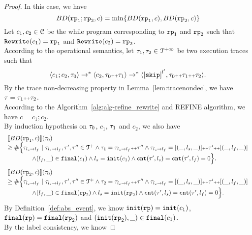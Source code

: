 \begin{proof}
In this case, we have
\[
  BD(\rprog_1; \rprog_2, c) = \min \left\{BD(\rprog_1, c), BD(\rprog_2, c) \right\}
\]
Let $c_1, c_2 \in \mathcal{C}$ be the while program corresponding to $\mathtt{rp}_1$ and $\mathtt{rp}_2$ such that $\mathtt{Rewrite}(c_1) = \mathtt{rp}_1$ and $\mathtt{Rewrite}(c_2) = \mathtt{rp}_2$.
\\
According to the operational semantics, let $\mathtt{\tau}_1, \mathtt{\tau}_2 \in \mathcal{T}^{+\infty}$ be two execution traces such that 
\[
  \config{c_1; c_2, \trace_0} \to^* \config{c_2, \trace_0 \tracecat \trace_1} \to^* \config{\clabel{\eskip}^{l'}, \trace_0 \tracecat \trace_1 \tracecat \trace_2}.
\]
By the trace non-decreasing property in Lemma~\ref{lem:tracenondec}, we have $\mathtt{\tau} = \mathtt{\tau}_1 {\scriptscriptstyle ++} \mathtt{\tau}_2$.
\\
According to the Algorithm~\ref{alg:alg-refine_rewrite} and REFINE algorithm, we have $c = c_1; c_2$.
\\
By induction hypothesis on $\mathtt{\tau}_0$, $c_1$, $\mathtt{\tau}_1$ and $c_2$, we also have
\[
  \begin{array}{l}
    \llbracket BD(\mathtt{rp}_1, c) \rrbracket(\mathtt{\tau}_0)
    \\ \geq
    \# \Big\{\mathtt{\tau}_{l_s \to l_f} ~\vert~ \mathtt{\tau}_{l_s \to l_f}, \mathtt{\tau}', \mathtt{\tau}''\in \mathcal{T}^{+}
    \land \mathtt{\tau}_1 = \mathtt{\tau}_{l_s \to l_f} {\scriptscriptstyle ++} \mathtt{\tau}''
    \land \mathtt{\tau}_{l_s \to l_f} = [(\_, l_s, \_)] {\scriptscriptstyle ++} \mathtt{\tau}' {\scriptscriptstyle ++} [(\_, l_f, \_)]
    \\ \qquad \qquad
    \land (l_{f}, \_) \in \mathtt{final}(c_1)
    \land l_s = \mathtt{init}(c_1)
    \land \mathtt{cnt}(\mathtt{\tau}', l_s) = \mathtt{cnt}(\mathtt{\tau}', l_f) = 0 
    \Big\}.
    \end{array}
\]
%
\[
  \begin{array}{l}
    \llbracket BD(\mathtt{rp}_2, c) \rrbracket(\mathtt{\tau}_0)
    \\ \geq
    \# \Big\{\mathtt{\tau}_{l_s \to l_f} ~\vert~ \mathtt{\tau}_{l_s \to l_f}, \mathtt{\tau}', \mathtt{\tau}''\in \mathcal{T}^{+}
    \land \mathtt{\tau}_2 = \mathtt{\tau}_{l_s \to l_f} {\scriptscriptstyle ++} \mathtt{\tau}''
    \land \mathtt{\tau}_{l_s \to l_f} = [(\_, l_s, \_)] {\scriptscriptstyle ++} \mathtt{\tau}' {\scriptscriptstyle ++} [(\_, l_f, \_)]
    \\ \qquad \qquad
    \land (l_{f}, \_) \in \mathtt{final}(\mathtt{rp}_2)
    \land l_s = \mathtt{init}(\mathtt{rp}_2)
    \land \mathtt{cnt}(\mathtt{\tau}', l_s) = \mathtt{cnt}(\mathtt{\tau}', l_f) = 0 
    \Big\}.
    \end{array}
\]
By Definition~\ref{def:abs_event}, we know
$\mathtt{init}(\mathtt{rp}) = \mathtt{init}(c_1)$, $\mathtt{final}(\mathtt{rp}) = \mathtt{final}(\mathtt{rp}_2)$ and $(\mathtt{init}(\mathtt{rp}_2), \_) \in \mathtt{final}(c_1)$. 
\\
By the label consistency, we know 

\end{proof}

